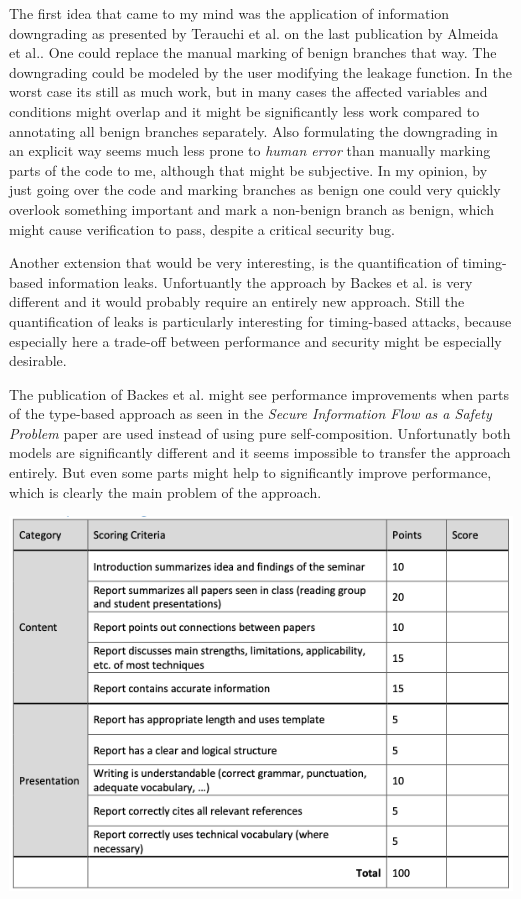 \documentclass[a4paper,UKenglish]{lipics-v2018}
\begin{document}
The first idea that came to my mind was the application of information downgrading as presented by Terauchi et al.\cite{secure_information_flow_safety} on the last publication by Almeida et al.\cite{verifying_constant_time_implementations}. One could replace the manual marking of benign branches that way. The downgrading could be modeled by the user modifying the leakage function. In the worst case its still as much work, but in many cases the affected variables and conditions might overlap and it might be significantly less work compared to annotating all benign branches separately. Also formulating the downgrading in an explicit way seems much less prone to \textit{human error} than manually marking parts of the code to me, although that might be subjective. In my opinion, by just going over the code and marking branches as benign one could very quickly overlook something important and mark a non-benign branch as benign, which might cause verification to pass, despite a critical security bug.

Another extension that would be very interesting, is the quantification of timing-based information leaks. Unfortuantly the approach by Backes et al.\cite{automatic_discovery_and_quantification} is very different and it would probably require an entirely new approach. Still the quantification of leaks is particularly interesting for timing-based attacks, because especially here a trade-off between performance and security might be especially desirable.

The publication of Backes et al.\cite{automatic_discovery_and_quantification} might see performance improvements when parts of the type-based approach as seen in the \textit{Secure Information Flow as a Safety Problem} paper are used instead of using pure self-composition. Unfortunatly both models are significantly different and it seems impossible to transfer the approach entirely. But even some parts might help to significantly improve performance, which is clearly the main problem of the approach.


\newpage
\includegraphics[scale = 0.72]{pictures/grading_scheme}\\

\newpage

\end{document}
